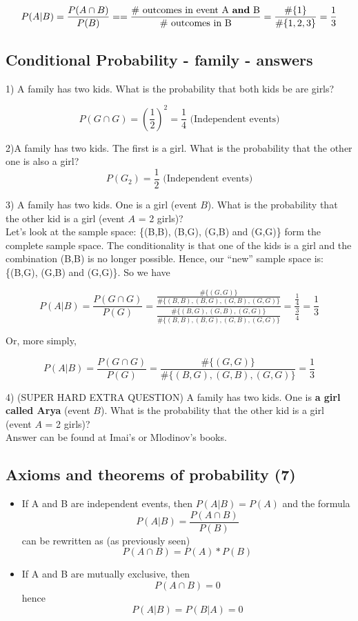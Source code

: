 \documentclass[11pt]{article}
\begin{document}
	
	\[P(A|B) = \frac{P(A\cap B)}{P(B)} = 		=\frac{\text{\# outcomes in event A \textbf{and} B}}
							{\text{\# outcomes in B}
							} = 
							\frac{\#\{1\}}{\#\{1,2,3\}}= 
							\frac{1}{3}\] 	 


	\subsection*{Conditional Probability - family - answers}
	1) A family has two kids. What is the probability that both kids be are girls?

	\[P(G \cap G) = \left(\frac{1}{2}\right)^2 = \frac{1}{4} \text{ (Independent events)}\]
	
	2)A family has two kids. The first is a girl. What is the probability that the other one is also a girl?\\

	\[P(G_2) = \frac{1}{2}\text{ (Independent events)}\]

	3) A family has two kids. One is a girl (event $B$). What is the probability that the other kid is a girl (event $A$ = 2 girls)?\\
	
	Let's look at the sample space: \{(B,B), (B,G), (G,B) and (G,G)\} form the complete sample space. The conditionality is that one of the kids is a girl and the combination (B,B) is no longer possible. Hence, our ``new'' sample space is: \{(B,G), (G,B) and (G,G)\}. So we have
	
	\[P(A|B) = \frac{P(G\cap G)}{P(G)} = \frac{\frac{\#\{(G,G)\}}{\#\{(B,B), (B,G), (G,B), (G,G)\}}}
							{\frac{\#\{(B,G), (G,B), (G,G)\}}{\#\{(B,B), (B,G), (G,B), (G,G)\}}} = 
							\frac{\frac{1}{4}}{\frac{3}{4}} = \frac{1}{3} \]

	Or, more simply, 
	
	\[P(A|B) = \frac{P(G\cap G)}{P(G)} = \frac{\#\{(G,G)\}}{\#\{(B,G), (G,B), (G,G)\}} = \frac{1}{3}\]

	4) (SUPER HARD EXTRA QUESTION) A family has two kids. One is \textbf{a girl called Arya} (event $B$). What is the probability that the other kid is a girl (event $A$ = 2 girls)?\\

	Answer can be found at Imai's or Mlodinov's books.

	\subsection*{Axioms and theorems of probability (7)}
	\begin{itemize}
		\item If A and B are independent events, then $P(A|B) = P(A)$ and the formula
	\[P(A|B) = \frac{P(A\cap B)}{P(B)}\]
	can be rewritten as (as previously seen)
	\[P(A\cap B) = P(A)*P(B)\]
			\item If A and B are mutually exclusive, then
		\[P(A\cap B) = 0\]
			hence
		 \[P(A|B) = P(B|A) = 0\] 
	\end{itemize}
\end{document}
